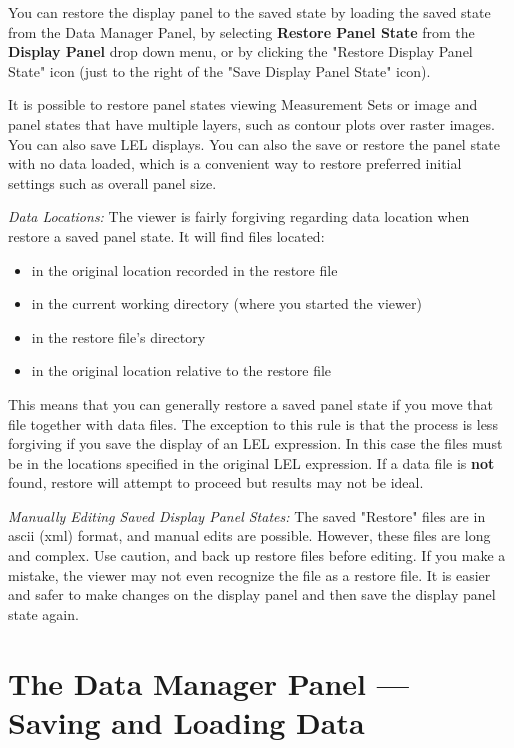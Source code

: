 You can restore the display panel to the saved state by loading the saved
state from the Data Manager Panel, by selecting {\bf Restore Panel State}
from the {\bf Display Panel} drop down menu, or by clicking the "Restore Display Panel State"
icon (just to the right of the "Save Display Panel State" icon).

It is possible to restore panel states viewing Measurement Sets or image and
panel states that have multiple layers, such as
contour plots over raster images. You can also save LEL displays.  You can also the save or 
restore the panel state with no data loaded, which is a
convenient way to restore preferred initial settings such as overall panel size.

{\em Data Locations:} The viewer is fairly forgiving regarding data location when restore a saved panel state.
It will find files located:
\begin{itemize}
  \item in the original location recorded in the restore file
  \item in the current working directory (where you started the viewer)
  \item in the restore file's directory
  \item in the original location relative to the restore file
\end{itemize}
This means that you can generally restore a saved panel state if you move that
file together with data files. The exception to this rule is that the process is less forgiving
if you save the display of an LEL expression. In this case the files must be in the locations 
specified in the original LEL expression.  If a data file is {\bf not} found, restore
will attempt to proceed but results may not be ideal. 

{\em Manually Editing Saved Display Panel States:} The saved "Restore" files are in ascii 
(xml) format, and manual edits are possible. However, these files are long and complex.  Use caution, and back 
up restore files before editing. If you make a mistake, the viewer may not  even recognize the file as a restore file.  
It is easier and safer to make changes on the display panel and then save the display panel state again.


\section{The Data Manager Panel --- Saving and Loading Data}
\label{section:display.dataManager}

